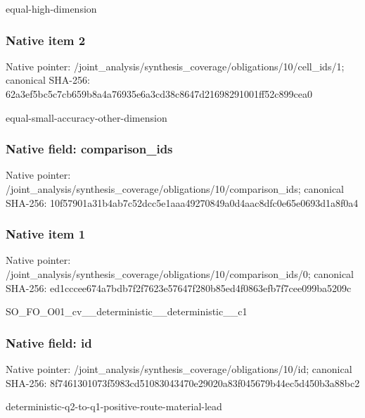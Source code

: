 \documentclass[10pt,a4paper]{article}
\begin{document}
\begingroup\raggedright\sloppy equal-high-dimension\par\endgroup

\subsubsection{Native item 2}
Native pointer: /joint\_\allowbreak{}analysis/synthesis\_\allowbreak{}coverage/obligations/10/cell\_\allowbreak{}ids/1; canonical SHA-256: 62a3ef5bc5c7cb659b8a4a76935e6a3cd38c8647d21698291001ff52c899cea0

\begingroup\raggedright\sloppy equal-small-accuracy-other-dimension\par\endgroup

\subsubsection{Native field: comparison\_\allowbreak{}ids}
Native pointer: /joint\_\allowbreak{}analysis/synthesis\_\allowbreak{}coverage/obligations/10/comparison\_\allowbreak{}ids; canonical SHA-256: 10f57901a31b4ab7c52dcc5e1aaa49270849a0d4aac8dfc0e65e0693d1a8f0a4

\subsubsection{Native item 1}
Native pointer: /joint\_\allowbreak{}analysis/synthesis\_\allowbreak{}coverage/obligations/10/comparison\_\allowbreak{}ids/0; canonical SHA-256: ed1cccee674a7bdb7f2f7623e57647f280b85ed4f0863efb7f7cee099ba5209c

\begingroup\raggedright\sloppy SO\_\allowbreak{}FO\_\allowbreak{}O01\_\allowbreak{}cv\_\allowbreak{}\_\allowbreak{}deterministic\_\allowbreak{}\_\allowbreak{}deterministic\_\allowbreak{}\_\allowbreak{}c1\par\endgroup

\subsubsection{Native field: id}
Native pointer: /joint\_\allowbreak{}analysis/synthesis\_\allowbreak{}coverage/obligations/10/id; canonical SHA-256: 8f7461301073f5983cd51083043470e29020a83f045679b44ec5d450b3a88bc2

\begingroup\raggedright\sloppy deterministic-q2-to-q1-positive-route-material-lead\par\endgroup
\end{document}
